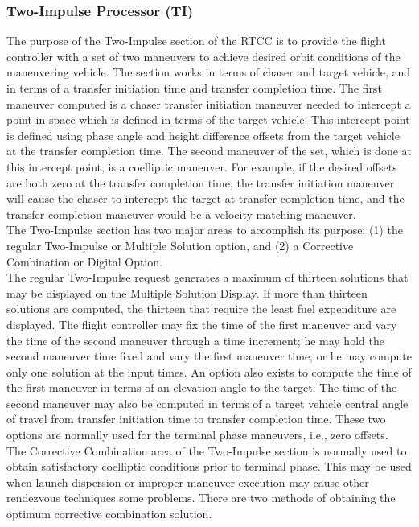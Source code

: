 \documentclass[11pt]{article} %
\begin{document}
\newpage
\subsubsection{Two-Impulse Processor (TI)}

The purpose of the Two-Impulse section of the RTCC is to provide the flight controller with a set of two maneuvers to achieve desired orbit conditions of the maneuvering vehicle. The section works in terms of chaser and target vehicle, and in terms of a transfer initiation time and transfer completion time. The first maneuver computed is a chaser transfer initiation maneuver needed to intercept a point in space which is defined in terms of the target vehicle. This intercept point is defined using phase angle and height difference offsets from the target vehicle at the transfer completion time. The second maneuver of the set, which is done at this intercept point, is a coelliptic maneuver. For example, if the desired offsets are both zero at the transfer completion time, the transfer initiation maneuver will cause the chaser to intercept the target at transfer completion time, and the transfer completion maneuver would be a velocity matching maneuver.\\

The Two-Impulse section has two major areas to accomplish its purpose: (1) the regular Two-Impulse or Multiple Solution option, and (2) a Corrective Combination or Digital Option.\\

The regular Two-Impulse request generates a maximum of thirteen solutions that may be displayed on the Multiple Solution Display. If more than thirteen solutions are computed, the thirteen that require the least fuel expenditure are displayed. The flight controller may fix the time of the first maneuver and vary the time of the second maneuver through a time increment; he may hold the second maneuver time fixed and vary the first maneuver time; or he may compute only one solution at the input times. An option also exists to compute the time of the first maneuver in terms of an elevation angle to the target. The time of the second maneuver may also be computed in terms of a target vehicle central angle of travel from transfer initiation time to transfer completion time. These two options are normally used for the terminal phase maneuvers, i.e., zero offsets.\\

The Corrective Combination area of the Two-Impulse section is normally used to obtain satisfactory coelliptic conditions prior to terminal phase. This may be
used when launch dispersion or improper maneuver execution may cause other rendezvous techniques some problems. There are two methods of obtaining the optimum corrective combination solution.\\
\end{document}
